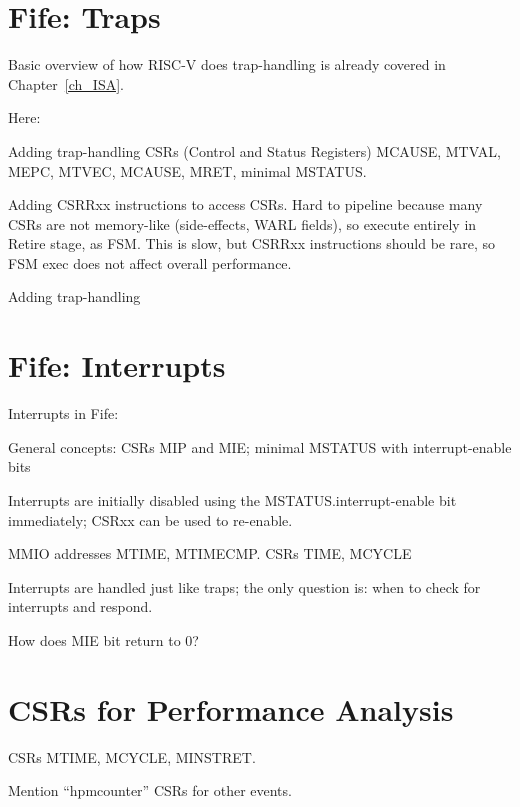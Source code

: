 \hdivider


\section{Fife: Traps}

Basic overview of how RISC-V does trap-handling is already covered in Chapter~\ref{ch_ISA}.

Here:

\begin{tightlist}

 \item Adding trap-handling CSRs (Control and Status Registers)
     MCAUSE, MTVAL, MEPC, MTVEC, MCAUSE, MRET, minimal MSTATUS.

 \item Adding CSRRxx instructions to access CSRs.  Hard to pipeline
       because many CSRs are not memory-like (side-effects, WARL
       fields), so execute entirely in Retire stage, as FSM.  This is
       slow, but CSRRxx instructions should be rare, so FSM exec does
       not affect overall performance.

 \item Adding trap-handling

\end{tightlist}


\section{Fife: Interrupts}

Interrupts in Fife:
\begin{tightlist}
  \item General concepts: CSRs MIP and MIE; minimal MSTATUS with interrupt-enable bits

  \item Interrupts are initially disabled using the
        MSTATUS.interrupt-enable bit immediately; CSRxx can be used to
        re-enable.

  \item MMIO addresses MTIME, MTIMECMP.  CSRs TIME, MCYCLE

  \item Interrupts are handled just like traps; the only question is:
        when to check for interrupts and respond.

  \item How does MIE bit return to 0?

\end{tightlist}


\section{CSRs for Performance Analysis}

CSRs MTIME, MCYCLE, MINSTRET.

Mention ``hpmcounter'' CSRs for other events.


